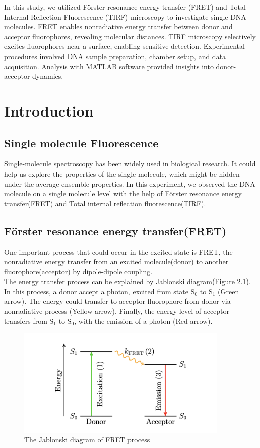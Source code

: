 \documentclass[a4paper,english,12pt,bibliography=totoc]{scrreprt}
\begin{document}
In this study, we utilized Förster resonance energy transfer (FRET) and Total Internal Reflection Fluorescence (TIRF) microscopy to investigate single DNA molecules. FRET enables nonradiative energy transfer between donor and acceptor fluorophores, revealing molecular distances. TIRF microscopy selectively excites fluorophores near a surface, enabling sensitive detection. Experimental procedures involved DNA sample preparation, chamber setup, and data acquisition. Analysis with MATLAB software provided insights into donor-acceptor dynamics.


\chapter{Introduction}
\label{cha:Introduction}

\section{Single molecule Fluorescence}
Single-molecule spectroscopy has been widely used in biological research. It could help us explore the properties of the single molecule, which might be hidden under the average ensemble properties. In this experiment, we observed the DNA molecule on a single molecule level with the help of Förster resonance energy transfer(FRET) and Total internal reflection fluorescence(TIRF).

\section{Förster resonance energy transfer(FRET)}

One important process that could occur in the excited state is FRET, the nonradiative energy transfer from an excited molecule(donor) to another fluorophore(acceptor) by dipole-dipole coupling. \\

The energy transfer process can be explained by Jablonski diagram(Figure 2.1). In this process, a donor accept a photon, excited from state $\mathrm{S_0}$ to $\mathrm{S_1}$ (Green arrow). The energy could transfer to acceptor fluorophore from donor via nonradiative process (Yellow arrow). Finally, the energy level of acceptor transfers from $\mathrm{S_1}$ to $\mathrm{S_0}$, with the emission of a photon (Red arrow).\\

\begin{figure}
    \centering
    \includegraphics[width = 0.9\textwidth]{images/FRET Jablonski.png}
    \caption{The Jablonski diagram of FRET process}
\end{figure}
\end{document}

